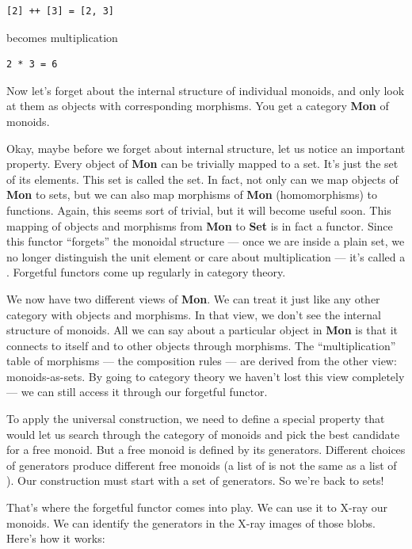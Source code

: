 \begin{Verbatim}[commandchars=\\\{\}]
[2] ++ [3] = [2, 3]
\end{Verbatim}
becomes multiplication

\begin{Verbatim}[commandchars=\\\{\}]
2 * 3 = 6
\end{Verbatim}
Now let's forget about the internal structure of individual monoids, and
only look at them as objects with corresponding morphisms. You get a
category \textbf{Mon} of monoids.

Okay, maybe before we forget about internal structure, let us notice an
important property. Every object of \textbf{Mon} can be trivially mapped
to a set. It's just the set of its elements. This set is called the
 set. In fact, not only can we map objects of
\textbf{Mon} to sets, but we can also map morphisms of \textbf{Mon}
(homomorphisms) to functions. Again, this seems sort of trivial, but it
will become useful soon. This mapping of objects and morphisms from
\textbf{Mon} to \textbf{Set} is in fact a functor. Since this functor
``forgets'' the monoidal structure --- once we are inside a plain set,
we no longer distinguish the unit element or care about multiplication
--- it's called a . Forgetful functors come up
regularly in category theory.

We now have two different views of \textbf{Mon}. We can treat it just
like any other category with objects and morphisms. In that view, we
don't see the internal structure of monoids. All we can say about a
particular object in \textbf{Mon} is that it connects to itself and to
other objects through morphisms. The ``multiplication'' table of
morphisms --- the composition rules --- are derived from the other view:
monoids-as-sets. By going to category theory we haven't lost this view
completely --- we can still access it through our forgetful functor.

To apply the universal construction, we need to define a special
property that would let us search through the category of monoids and
pick the best candidate for a free monoid. But a free monoid is defined
by its generators. Different choices of generators produce different
free monoids (a list of  is not the same as a list of
). Our construction must start with a set of generators. So
we're back to sets!

That's where the forgetful functor comes into play. We can use it to
X-ray our monoids. We can identify the generators in the X-ray images of
those blobs. Here's how it works:

